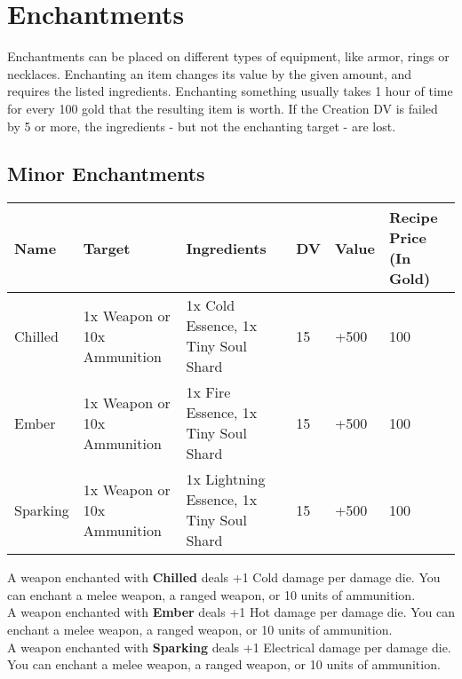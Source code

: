 \section{Enchantments}\label{sec:enchantments}
Enchantments can be placed on different types of equipment, like armor, rings or necklaces.
Enchanting an item changes its value by the given amount, and requires the listed ingredients.
Enchanting something usually takes 1 hour of time for every 100 gold that the resulting item is worth.
If the Creation DV is failed by 5 or more, the ingredients - but not the enchanting target - are lost.\\


\subsection{Minor Enchantments}
\begin{longtable}{l | p{2.5cm} | p{2.5cm}| l | l | l }
	Name & Target & Ingredients & DV & Value & Recipe Price (In Gold)\\ \hline
	Chilled & 1x Weapon or 10x Ammunition & 1x Cold Essence, 1x Tiny Soul Shard & 15 & +500 & 100\\
	Ember & 1x Weapon or 10x Ammunition & 1x Fire Essence, 1x Tiny Soul Shard & 15 & +500 & 100\\
	Sparking & 1x Weapon or 10x Ammunition & 1x Lightning Essence, 1x Tiny Soul Shard & 15 & +500 & 100\\
\end{longtable}

A weapon enchanted with \textbf{Chilled} deals +1 Cold damage per damage die.
You can enchant a melee weapon, a ranged weapon, or 10 units of ammunition.\\

A weapon enchanted with \textbf{Ember} deals +1 Hot damage per damage die.
You can enchant a melee weapon, a ranged weapon, or 10 units of ammunition.\\

A weapon enchanted with \textbf{Sparking} deals +1 Electrical damage per damage die.
You can enchant a melee weapon, a ranged weapon, or 10 units of ammunition.\\
